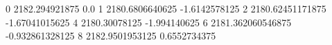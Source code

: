 0 2182.294921875 0.0
1 2180.6806640625 -1.6142578125
2 2180.62451171875 -1.67041015625
4 2180.30078125 -1.994140625
6 2181.362060546875 -0.932861328125
8 2182.9501953125 0.6552734375
